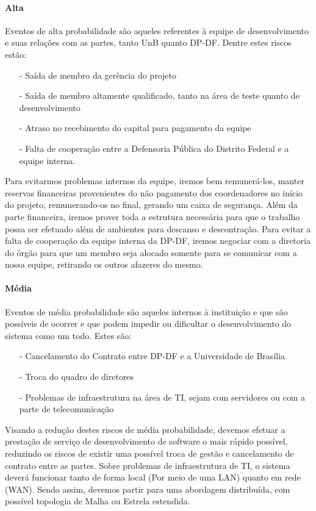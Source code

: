 \documentclass[12pt,a4paper]{report}
\begin{document}
\paragraph{Alta} Eventos de alta probabilidade são aqueles referentes à equipe de desenvolvimento e suas relações com as partes, tanto UnB quanto DP-DF. Dentre estes riscos estão:

\begin{itemize}
\item [-] Saída de membro da gerência do projeto
\item [-] Saída de membro altamente qualificado, tanto na área de teste quanto de desenvolvimento
\item [-] Atraso no recebimento do capital para pagamento da equipe
\item [-] Falta de cooperação entre a Defensoria Pública do Distrito Federal e a equipe interna.
\end{itemize}

Para evitarmos problemas internos da equipe, iremos bem remunerá-los, manter reservas financeiras provenientes do não pagamento dos coordenadores no início do projeto, remunerando-os no final, gerando um caixa de segurança. Além da parte financeira, iremos prover toda a estrutura necessária para que o trabalho possa ser efetuado além de ambientes para descanso e descontração. Para evitar a falta de cooperação da equipe interna da DP-DF, iremos negociar com a diretoria do órgão para que um membro seja alocado somente para se comunicar com a nossa equipe, retirando os outros afazeres do mesmo.

\paragraph{Média} Eventos de média probabilidade são aqueles internos à instituição e que são possíveis de ocorrer e que podem impedir ou dificultar o desenvolvimento do sistema como um todo. Estes são:
\begin{itemize}
\item [-] Cancelamento do Contrato entre DP-DF e a Universidade de Brasília
\item [-] Troca do quadro de diretores
\item [-] Problemas de infraestrutura na área de TI, sejam com servidores ou com a parte de telecomunicação
\end{itemize}

Visando a redução destes riscos de média probabilidade, devemos efetuar a prestação de serviço de desenvolvimento de software o mais rápido possível, reduzindo os riscos de existir uma possível troca de gestão e cancelamento de contrato entre as partes.
Sobre problemas de infraestrutura de TI, o sistema deverá funcionar tanto de forma local (Por meio de uma LAN) quanto em rede (WAN). Sendo assim, devemos partir para uma abordagem distribuída, com possível topologia de Malha ou Estrela estendida.
\end{document}
